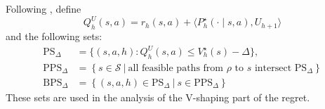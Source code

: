 \documentclass[twoside]{article}
\newcommand{\indic}[1]{\mathbb{I}\left\{#1\right\}}
\newcommand{\BPS}{\mathrm{BPS}_{\Delta}} %
\newcommand{\PPS}{\mathrm{PPS}_{\Delta}} %
\newcommand{\PS}{\mathrm{PS}_{\Delta}} %
\newcommand{\highv}{U} %
\newcounter{notecounter}
\newcommand{\note}[2]{\refstepcounter{notecounter} \begin{leftbar}  \textcolor{red}{\textbf{#1}} \textcolor{violet}{(\textbf{Note} \thenotecounter)}: \begin{sf}{\color{blue} #2} \end{sf}  \end{leftbar}}
\newcommand{\note}[2]{}
\begin{document}


Following \cite{gupta_unpacking_2022}, define 
\[
Q_h^{\highv}(s,a)=r_h(s,a)+\langle P_h^\star( \cdot\mid s,a),  \highv_{h+1} \rangle
\]
and the following sets:
%
\begin{align}\label{eq:def_PS_Delta}
\PS
&=\Big\{(s,a,h): Q_h^{\highv}(s,a)\le V_h^\star(s)-\Delta\Big\},\\
\PPS 
&=  \left \lbrace s \in \mathcal{S} ~\vert~ \text{all feasible paths from } \rho \text{ to } s \text{ intersect } \PS \right \rbrace\\
\BPS
&= \left \lbrace (s,a,h) \in \PS ~ \vert ~ s \in \PPS  \right \rbrace
\end{align}
These sets are used in the analysis of the V-shaping part of the regret.
\end{document}
